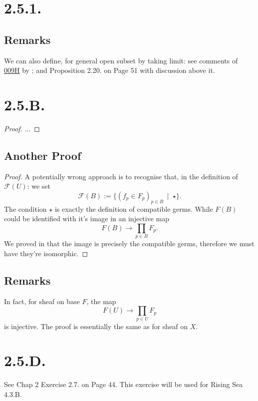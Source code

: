 \section{2.5.1.}

\subsection{Remarks}

We can also define, for general open subset by taking limit: see comments of \href{https://stacks.math.columbia.edu/tag/009H}{009H} by \cite{stacks-project}; and \cite{gortz2020algebraic} Proposition 2.20. on Page 51 with discussion above it.

\section{2.5.B.}

\begin{proof}
	...	
\end{proof}

\subsection{Another Proof}

\begin{proof}
A potentially wrong approach is to recognise that, in the definition of $\mathscr F(U)$: we set 
\[\mathscr F(B):=\{(f_p\in F_p)_{p\in B} ~\mid~ \star\}.\]
The condition $\star$ is exactly the definition of compatible germs. While $F(B)$ could be identified with it's image in an injective map
\[F(B)\to \prod_{p\in B}F_p.\]
We proved in  that the image is precisely the compatible germs, therefore we must have they're isomorphic.
\end{proof}

\subsection{Remarks}

In fact, for sheaf on base $F$, the map
\[F(U)\to\prod_{p\in U}F_p\] is injective. The proof is essentially the same as for sheaf on $X$.

\section{2.5.D.}

See \cite{qing2006algebraic} Chap 2 Exercise 2.7. on Page 44. This exercise will be used for Rising Sea \cite{RaviRisingSea} 4.3.B.

